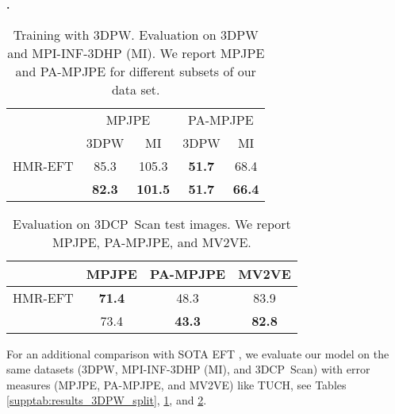 \documentclass[final]{cvpr}
\newcommand{\threedcpscan}{\mbox{3DCP Scan}\xspace}
\theoremstyle{definition}
\begin{document}
\textbf{.} 
\begin{table}
	\begin{center}
		\setlength\tabcolsep{2pt}
		\setlength{\extrarowheight}{2pt}
		\begin{tabular}{lcccc}
			\toprule[1pt]
			& \multicolumn{2}{c}{MPJPE }     & \multicolumn{2}{c}{PA-MPJPE }  \\  \cline{2-5} 
			& 3DPW & MI        & 3DPW & MI      \\   
			\hline
			HMR-EFT \cite{joo2020eft}        & 85.3          & 105.3               & \textbf{51.7}          & 68.4          \\
			  & \textbf{82.3} & \textbf{101.5}          & \textbf{51.7} & \textbf{66.4}         \\
			\bottomrule[1pt]
		\end{tabular}
	\end{center}
	\caption{Training with 3DPW. Evaluation on 3DPW and MPI-INF-3DHP (MI). We report MPJPE and PA-MPJPE for different subsets of our data set.}
	\label{supptab:results_w3dpw}
\end{table}
\begin{table}
	\begin{center}
		\setlength\tabcolsep{2pt}
		\setlength{\extrarowheight}{2pt}
		\begin{tabular}{lccc}
			\toprule[1pt]
		               & MPJPE  & PA-MPJPE  & MV2VE  \\
		    \hline
			      HMR-EFT \cite{joo2020eft}   & \textbf{71.4}           & 48.3              & 83.9  \\
			   & 73.4           & \textbf{43.3}              & \textbf{82.8}       \\
			\bottomrule[1pt]  
		\end{tabular}
	\end{center}
	\caption{Evaluation on \threedcpscan test images. We report MPJPE, PA-MPJPE, and MV2VE. }
	\label{supptab:threedcpscanResult}
\end{table}

For an additional comparison with SOTA EFT
\cite{joo2020eft}, we evaluate our  model
on the same datasets (3DPW, MPI-INF-3DHP (MI), and \threedcpscan) with error
measures (MPJPE, PA-MPJPE, and MV2VE) like TUCH, see Tables
\ref{supptab:results_3DPW_split}, \ref{supptab:results_w3dpw}, and
\ref{supptab:threedcpscanResult}. 
\end{document}
